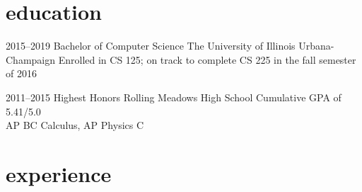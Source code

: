 \documentclass[]{resume} %
\begin{document}
\section{education}

\begin{entrylist}


\entry
{2015--2019}
{Bachelor {\normalfont of Computer Science}}
{The University of Illinois Urbana-Champaign}
{Enrolled in CS 125; on track to complete CS 225 in the fall semester of 2016}


\entry
{2011--2015}
{Highest {\normalfont Honors}}
{Rolling Meadows High School}
{Cumulative GPA of 5.41/5.0 \\
AP BC Calculus, AP Physics C}


\end{entrylist}


\section{experience}

\end{document}
